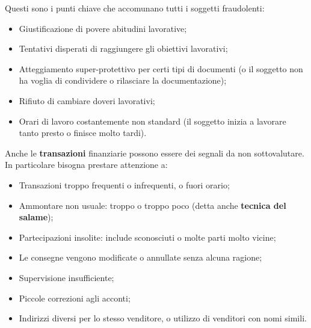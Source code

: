 Questi sono i punti chiave che accomunano tutti i soggetti fraudolenti:
\begin{itemize}
  \item Giustificazione di povere abitudini lavorative;
  \item Tentativi disperati di raggiungere gli obiettivi lavorativi;
  \item Atteggiamento super-protettivo per certi tipi di documenti (o il 
  soggetto non ha voglia di condividere o rilasciare la documentazione);
  \item Rifiuto di cambiare doveri lavorativi;
  \item Orari di lavoro costantemente non standard (il soggetto inizia a 
  lavorare tanto presto o finisce molto tardi).
\end{itemize}

Anche le \textbf{transazioni} finanziarie possono essere dei segnali da non 
sottovalutare. In particolare bisogna prestare attenzione a:
\begin{itemize}
  \item Transazioni troppo frequenti o infrequenti, o fuori orario;
  \item Ammontare non usuale: troppo o troppo poco (detta anche
  \textbf{tecnica del salame});
  \item Partecipazioni insolite: include sconosciuti o molte parti molto vicine;
  \item Le consegne vengono modificate o annullate senza alcuna ragione;
  \item Supervisione insufficiente;
  \item Piccole correzioni agli acconti;
  \item Indirizzi diversi per lo stesso venditore, o utilizzo di venditori con 
  nomi simili.
\end{itemize}
